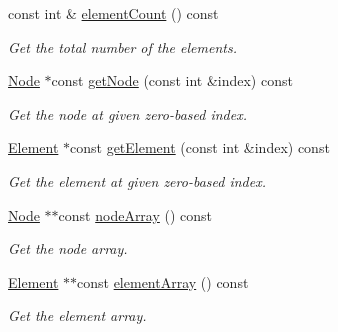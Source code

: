 \begin{DoxyCompactItemize}
const int \& \mbox{\hyperlink{class_mesh_aa1b2aafa40bd4b335e9bf6306e482881}{element\+Count}} () const
\begin{DoxyCompactList}\small\item\em Get the total number of the elements. \end{DoxyCompactList}\item 
\mbox{\hyperlink{class_node}{Node}} $\ast$const \mbox{\hyperlink{class_mesh_a071a8dfe15c00fcabc9c4071306487d4}{get\+Node}} (const int \&index) const
\begin{DoxyCompactList}\small\item\em Get the node at given zero-\/based index. \end{DoxyCompactList}\item 
\mbox{\hyperlink{class_element}{Element}} $\ast$const \mbox{\hyperlink{class_mesh_ada2ae7b8640a3999780d7e738ee4154e}{get\+Element}} (const int \&index) const
\begin{DoxyCompactList}\small\item\em Get the element at given zero-\/based index. \end{DoxyCompactList}\item 
\mbox{\hyperlink{class_node}{Node}} $\ast$$\ast$const \mbox{\hyperlink{class_mesh_ae596a597115563fb308d99e5e15a62e6}{node\+Array}} () const
\begin{DoxyCompactList}\small\item\em Get the node array. \end{DoxyCompactList}\item 
\mbox{\hyperlink{class_element}{Element}} $\ast$$\ast$const \mbox{\hyperlink{class_mesh_a042cc2ef19b7090f830b915721818181}{element\+Array}} () const
\begin{DoxyCompactList}\small\item\em Get the element array. \end{DoxyCompactList}\end{DoxyCompactItemize}
